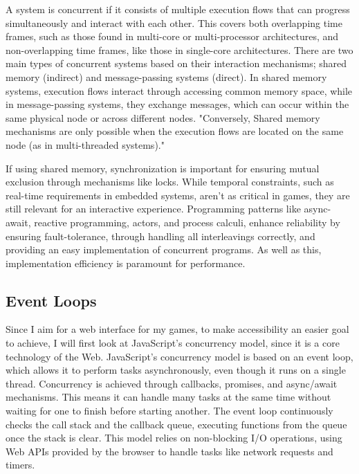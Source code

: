 \documentclass[]{project_interim}
\begin{document}
A system is concurrent if it consists of multiple execution flows that
can progress simultaneously and interact with each other.
This covers both overlapping time frames, such as those found
in multi-core or multi-processor architectures, and non-overlapping
time frames, like those in single-core architectures.\cite{bianchi_survey_2018}
There are two main types of concurrent systems based on their interaction
mechanisms; shared memory (indirect) and message-passing systems (direct).\cite{bianchi_survey_2018}
In shared memory systems, execution flows interact through accessing
common memory space, while in message-passing systems,
they exchange messages, which can occur within the same physical
node or across different nodes. "Conversely, Shared memory mechanisms
are only possible when the execution flows are
located on the same node (as in multi-threaded systems)."\cite{bianchi_survey_2018}

If using shared memory, synchronization is important
for ensuring mutual exclusion through mechanisms like locks.
While temporal constraints, such as real-time requirements in embedded systems,
aren't as critical in games, they are still relevant for an interactive
experience. Programming patterns like async-await, reactive programming,
actors, and process calculi, enhance reliability by ensuring fault-tolerance,
through handling all interleavings correctly,
and providing an easy implementation of concurrent programs. As well as this, implementation efficiency
is paramount for performance.

\subsection{Event Loops}
Since I aim for a web interface for my games, to make
accessibility an easier goal to achieve, I will first look at JavaScript's
concurrency model, since it is a core technology of the Web.
JavaScript's concurrency model is based on an event loop, which allows it to
perform tasks asynchronously, even though it runs on a single thread.\cite{zhao_concurrency_2021}
Concurrency is achieved through callbacks, promises, and
async/await mechanisms. This means it can handle many tasks at the same time without waiting for one
to finish before starting another. The event loop continuously checks the call
stack and the callback queue, executing functions from the queue once
the stack is clear. This model relies on non-blocking I/O operations,
using Web APIs provided by the browser to handle tasks like network
requests and timers. \cite{noauthor_event_2024}
\end{document}
